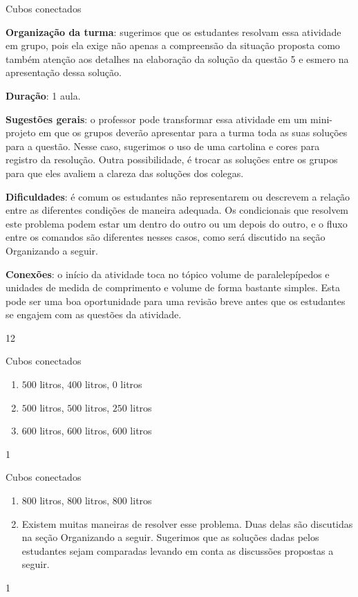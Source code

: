 \begin{sugestions}{Cubos conectados}
{
\textbf{Organização da turma}: sugerimos que os estudantes resolvam essa atividade em grupo, pois ela exige não apenas a compreensão da situação proposta como também atenção aos detalhes na elaboração da solução da questão 5 e esmero na apresentação dessa solução.

\textbf{Duração}: 1 aula.

\textbf{Sugestões gerais}: o professor pode transformar essa atividade em um mini-projeto em que os grupos deverão apresentar para a turma toda as suas soluções para a questão. Nesse caso, sugerimos o uso de uma cartolina e cores para registro da resolução. Outra possibilidade, é trocar as soluções entre os grupos para que eles avaliem a clareza das soluções dos colegas.

\textbf{Dificuldades}: é comum os estudantes não representarem ou descrevem a relação entre as diferentes condições de maneira adequada. Os condicionais que resolvem este problema podem estar um dentro do outro ou um depois do outro, e o fluxo entre os comandos são diferentes nesses casos, como será discutido na seção Organizando a seguir.

\textbf{Conexões}: o início da atividade toca no tópico volume de paralelepípedos e unidades de medida de comprimento e volume de forma bastante simples. Esta pode ser uma boa oportunidade para uma revisão breve antes que os estudantes se engajem com as questões da atividade.
}{1}{2}
\end{sugestions}
\begin{answer}{Cubos conectados}
{
\begin{enumerate}
\item $500$ litros, $400$ litros, $0$ litros

\item $500$ litros, $500$ litros, $250$ litros

\item $600$ litros, $600$ litros, $600$ litros
\end{enumerate}
}{1}
\end{answer}
\begin{answer}{Cubos conectados}
{
\begin{enumerate}
\item $800$ litros, $800$ litros, $800$ litros

\item Existem muitas maneiras de resolver esse problema. Duas delas são discutidas na seção Organizando a seguir. Sugerimos que as soluções dadas pelos estudantes sejam comparadas levando em conta as discussões propostas a seguir.
\end{enumerate}
}{1}
\end{answer}

